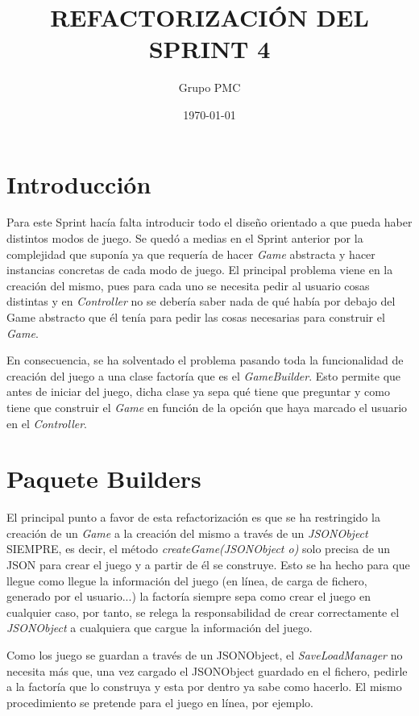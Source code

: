 \documentclass{article}
\title{REFACTORIZACIÓN DEL SPRINT 4}
\date{\today}
\author{Grupo PMC}
\begin{document}
\maketitle
\section*{Introducción}
Para este Sprint hacía falta introducir todo el diseño orientado a que pueda haber distintos modos de juego. Se quedó a medias en el Sprint anterior por la complejidad que suponía ya que requería de hacer \textit{Game} abstracta y hacer instancias concretas de cada modo de juego. El principal problema viene en la creación del mismo, pues para cada uno se necesita pedir al usuario cosas distintas y en \textit{Controller} no se debería saber nada de qué había por debajo del Game abstracto que él tenía para pedir las cosas necesarias para construir el \textit{Game}.

En consecuencia, se ha solventado el problema pasando toda la funcionalidad de creación del juego a una clase factoría que es el \textit{GameBuilder}. Esto permite que antes de iniciar del juego, dicha clase ya sepa qué tiene que preguntar y como tiene que construir el \textit{Game} en función de la opción que haya marcado el usuario en el \textit{Controller}.
 

\section*{Paquete Builders}

El principal punto a favor de esta refactorización es que se ha restringido la creación de un \textit{Game} a la creación del mismo a través de un \textit{JSONObject} SIEMPRE, es decir, el método \textit{createGame(JSONObject o)} solo precisa de un JSON para crear el juego y a partir de él se construye. Esto se ha hecho para que llegue como llegue la información del juego (en línea, de carga de fichero, generado por el usuario...) la factoría siempre sepa como crear el juego en cualquier caso, por tanto, se relega la responsabilidad de crear correctamente el \textit{JSONObject} a cualquiera que cargue la información del juego.

Como los juego se guardan a través de un JSONObject, el \textit{SaveLoadManager} no necesita más que, una vez cargado el JSONObject guardado en el fichero, pedirle a la factoría que lo construya y esta por dentro ya sabe como hacerlo. El mismo procedimiento se pretende para el juego en línea, por ejemplo.
\end{document}
